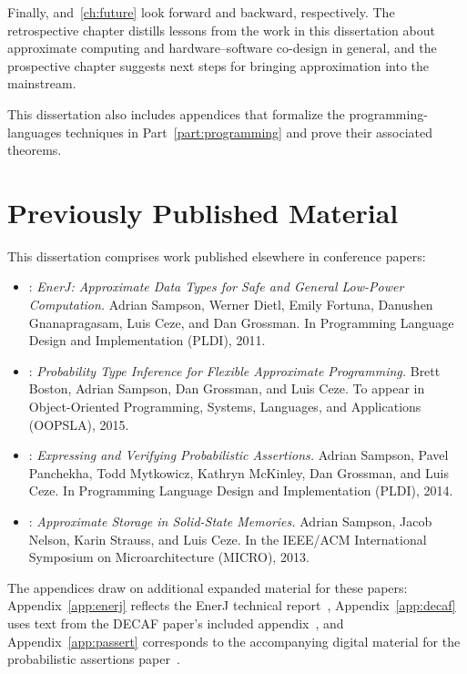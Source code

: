 Finally,  and~\ref{ch:future} look forward and
backward, respectively.
The retrospective chapter distills lessons from the work in this dissertation
about approximate computing and hardware--software co-design in general, and
the prospective chapter suggests next steps for bringing approximation into
the mainstream.

This dissertation also includes appendices that formalize the
programming-languages techniques in Part~\ref{part:programming} and prove
their associated theorems.


\section{Previously Published Material}

This dissertation comprises work published elsewhere in conference papers:
%
\begin{itemize}
\item {}:
\textit{EnerJ: Approximate Data Types for Safe and General Low-Power
Computation.}
Adrian Sampson, Werner Dietl, Emily Fortuna, Danushen Gnanapragasam, Luis Ceze, and Dan Grossman.
In Programming Language Design and Implementation (PLDI), 2011.
\cite{enerj}

\item {}:
\textit{Probability Type Inference for Flexible Approximate Programming.}
Brett Boston, Adrian Sampson, Dan Grossman, and Luis Ceze.
To appear in Object-Oriented Programming, Systems, Languages, and Applications
(OOPSLA), 2015.
\cite{decaf}

\item {}:
\textit{Expressing and Verifying Probabilistic Assertions.}
Adrian Sampson, Pavel Panchekha, Todd Mytkowicz, Kathryn McKinley, Dan Grossman, and Luis Ceze.
In Programming Language Design and Implementation (PLDI), 2014.
\cite{passert}

\item {}:
\textit{Approximate Storage in Solid-State Memories.}
Adrian Sampson, Jacob Nelson, Karin Strauss, and Luis Ceze.
In the IEEE/ACM International Symposium on Microarchitecture (MICRO), 2013.
\cite{approxstorage}
\end{itemize}
%
The appendices draw on additional expanded material for these papers:
Appendix~\ref{app:enerj} reflects the EnerJ technical report~\cite{enerj-tr},
Appendix~\ref{app:decaf} uses text from the DECAF paper's included
appendix~\cite{decaf}, and
Appendix~\ref{app:passert} corresponds to the accompanying digital
material for the probabilistic assertions paper~\cite{passert-tr}.
